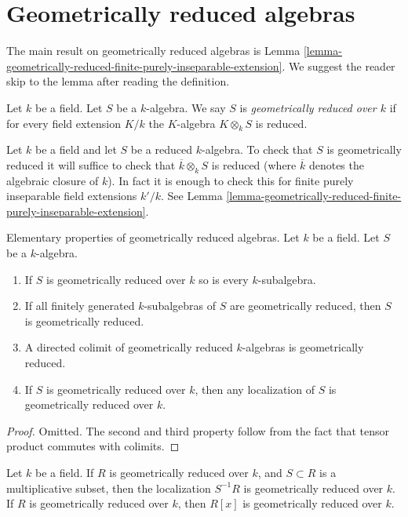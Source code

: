 \section{Geometrically reduced algebras}
\label{section-geometrically-reduced}

\noindent
The main result on geometrically reduced algebras is
Lemma \ref{lemma-geometrically-reduced-finite-purely-inseparable-extension}.
We suggest the reader skip to the lemma after reading the definition.

\begin{definition}
\label{definition-geometrically-reduced}
Let $k$ be a field. Let $S$ be a $k$-algebra.
We say $S$ is {\it geometrically reduced over $k$}
if for every field extension $K/k$ the
$K$-algebra $K \otimes_k S$ is reduced.
\end{definition}

\noindent
Let $k$ be a field and let $S$ be a reduced $k$-algebra.
To check that $S$ is geometrically reduced it will suffice
to check that $\overline{k} \otimes_k S$ is reduced (where
$\overline{k}$ denotes the algebraic closure of $k$).
In fact it is enough to check this for finite purely inseparable
field extensions $k'/k$. See
Lemma \ref{lemma-geometrically-reduced-finite-purely-inseparable-extension}.

\begin{lemma}
\label{lemma-subalgebra-separable}
Elementary properties of geometrically reduced algebras.
Let $k$ be a field. Let $S$ be a $k$-algebra.
\begin{enumerate}
\item If $S$ is geometrically reduced over $k$ so is every
$k$-subalgebra.
\item If all finitely generated $k$-subalgebras of $S$ are
geometrically reduced, then $S$ is geometrically reduced.
\item A directed colimit of geometrically reduced $k$-algebras
is geometrically reduced.
\item If $S$ is geometrically reduced over $k$, then any localization
of $S$ is geometrically reduced over $k$.
\end{enumerate}
\end{lemma}

\begin{proof}
Omitted. The second and third property follow from the fact that
tensor product commutes with colimits.
\end{proof}

\begin{lemma}
\label{lemma-geometrically-reduced-permanence}
Let $k$ be a field.
If $R$ is geometrically reduced over $k$,
and $S \subset R$ is a multiplicative subset, then the localization
$S^{-1}R$ is geometrically reduced over $k$.
If $R$ is geometrically reduced over $k$, then $R[x]$ is geometrically
reduced over $k$.
\end{lemma}

